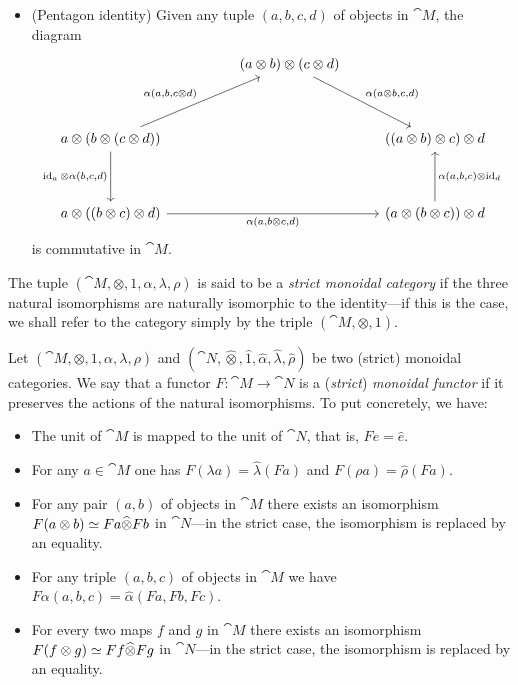 \documentclass[../../deep-dive]{subfiles}
\begin{document}
\begin{definition}
\begin{itemize}
\item (Pentagon identity) Given any tuple \((a, b, c, d)\) of objects in
  \(\cat M\), the diagram
  \[
  \begin{tikzcd}
  &
  &(a \otimes b) \otimes (c \otimes d)
  \ar[rdd, "{\alpha(a \otimes b, c, d)}"]
  &
  \\
  & & &
  \\
  a \otimes (b \otimes (c \otimes d))
  \ar[dd, "{\Id_a \otimes \alpha(b, c, d)}"']
  \ar[rruu, "{\alpha(a, b, c \otimes d)}"]
  &
  &
  &((a \otimes b) \otimes c) \otimes d
  \\
  & & &
  \\
  a \otimes ((b \otimes c) \otimes d)
  \ar[rrr, "{\alpha(a, b \otimes c, d)}"']
  &
  &
  &(a \otimes (b \otimes c)) \otimes d
  \ar[uu, "{\alpha(a, b, c) \otimes \Id_d}"']
  \end{tikzcd}
  \]
  is commutative in \(\cat M\).
\end{itemize}
\end{definition}
The tuple \((\cat M, \otimes, 1, \alpha, \lambda, \rho)\) is said to be a
\emph{strict monoidal category} if the three natural isomorphisms are naturally
isomorphic to the identity---if this is the case, we shall refer to the category
simply by the triple \((\cat M, \otimes, 1)\).

\begin{definition}
\label{def:monoidal-functor}
Let \((\cat M, \otimes, 1, \alpha, \lambda, \rho)\) and \((\cat N,
\widehat\otimes, \widehat 1, \widehat \alpha, \widehat \lambda, \widehat \rho)\)
be two (strict) monoidal categories. We say that a functor \(F: \cat M \to \cat
N\) is a (\emph{strict}) \emph{monoidal functor} if it preserves the actions of
the natural isomorphisms. To put concretely, we have:
\begin{itemize}\setlength\itemsep{0em}
\item The unit of \(\cat M\) is mapped to the unit of \(\cat N\), that is,
  \(F e = \widehat e\).

\item For any \(a \in \cat M\) one has
  \(F (\lambda a) = \widehat \lambda (F a)\) and
  \(F (\rho a) = \widehat \rho(F a)\).

\item For any pair \((a, b)\) of objects in \(\cat M\) there exists an
  isomorphism \(F(a \otimes b) \simeq F a \widehat \otimes F b\) in \(\cat
  N\)---in the strict case, the isomorphism is replaced by an equality.

\item For any triple \((a, b, c)\) of objects in \(\cat M\) we have
  \(F \alpha(a, b, c) = \widehat \alpha (F a, F b, F c)\).

\item For every two maps \(f\) and \(g\) in \(\cat M\) there exists an
  isomorphism \(F(f \otimes g) \simeq F f \widehat \otimes F g\) in
  \(\cat N\)---in the strict case, the isomorphism is replaced by an equality.
\end{itemize}
\end{definition}
\end{document}
